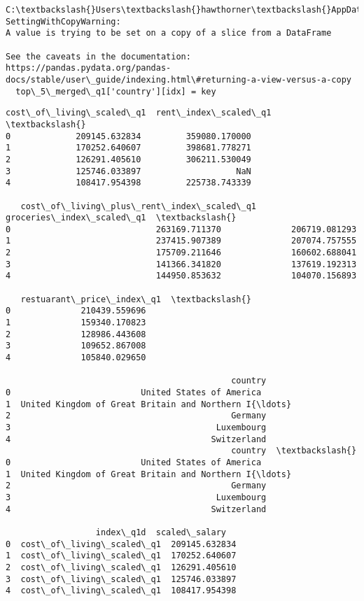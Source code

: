 \documentclass[11pt]{article}
\begin{document}
    \begin{Verbatim}[commandchars=\\\{\}]
C:\textbackslash{}Users\textbackslash{}hawthorner\textbackslash{}AppData\textbackslash{}Local\textbackslash{}Temp\textbackslash{}ipykernel\_22188\textbackslash{}3418214267.py:32:
SettingWithCopyWarning:
A value is trying to be set on a copy of a slice from a DataFrame

See the caveats in the documentation: https://pandas.pydata.org/pandas-
docs/stable/user\_guide/indexing.html\#returning-a-view-versus-a-copy
  top\_5\_merged\_q1['country'][idx] = key
    \end{Verbatim}

    \begin{Verbatim}[commandchars=\\\{\}]
   cost\_of\_living\_scaled\_q1  rent\_index\_scaled\_q1  \textbackslash{}
0             209145.632834         359080.170000
1             170252.640607         398681.778271
2             126291.405610         306211.530049
3             125746.033897                   NaN
4             108417.954398         225738.743339

   cost\_of\_living\_plus\_rent\_index\_scaled\_q1  groceries\_index\_scaled\_q1  \textbackslash{}
0                             263169.711370              206719.081293
1                             237415.907389              207074.757555
2                             175709.211646              160602.688041
3                             141366.341820              137619.192313
4                             144950.853632              104070.156893

   restuarant\_price\_index\_q1  \textbackslash{}
0              210439.559696
1              159340.170823
2              128986.443608
3              109652.867008
4              105840.029650

                                             country
0                          United States of America
1  United Kingdom of Great Britain and Northern I{\ldots}
2                                            Germany
3                                         Luxembourg
4                                        Switzerland
                                             country  \textbackslash{}
0                          United States of America
1  United Kingdom of Great Britain and Northern I{\ldots}
2                                            Germany
3                                         Luxembourg
4                                        Switzerland

                  index\_q1d  scaled\_salary
0  cost\_of\_living\_scaled\_q1  209145.632834
1  cost\_of\_living\_scaled\_q1  170252.640607
2  cost\_of\_living\_scaled\_q1  126291.405610
3  cost\_of\_living\_scaled\_q1  125746.033897
4  cost\_of\_living\_scaled\_q1  108417.954398
    \end{Verbatim}
\end{document}
